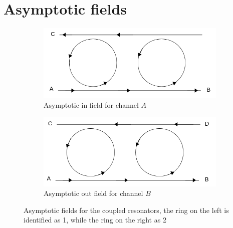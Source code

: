 \section{Asymptotic fields}
\begin{figure}
\centering
\begin{subfigure}{0.5\textwidth}
\centering
\includegraphics[width = \textwidth]{img/Asyina}
\caption{Asymptotic in field for channel $A$}
\end{subfigure}%
\begin{subfigure}{0.5\textwidth}
\includegraphics[width = \textwidth]{img/Asyoutb}
\caption{Asymptotic out field for channel $B$}
\end{subfigure}
\caption{Asymptotic fields for the coupled resonators, the ring on the left is identified as 1, while the ring on the right as 2}\label{asyfields}
\end{figure}

